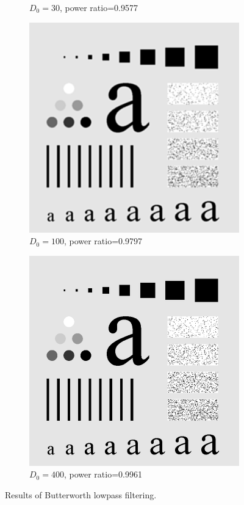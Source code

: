 \begin{figure}[h!]
\begin{subfigure}[b]{0.45\linewidth}
		\caption{$D_0=30$, power ratio=0.9577}
		\label{fig:BLPF_30}
	\end{subfigure}
  	\begin{subfigure}[b]{0.45\linewidth}
		\includegraphics[width=\linewidth]{myfigure/p3/BLPF_100.png}
		\caption{$D_0=100$, power ratio=0.9797}
		\label{fig:BLPF_100}
	\end{subfigure}
	\begin{subfigure}[b]{0.45\linewidth}
		\includegraphics[width=\linewidth]{myfigure/p3/BLPF_400.png}
		\caption{$D_0=400$, power ratio=0.9961}
		\label{fig:BLPF_400}
	\end{subfigure}
  	\caption{Results of Butterworth lowpass filtering.}
  	\label{fig:BLPF}
\end{figure}

